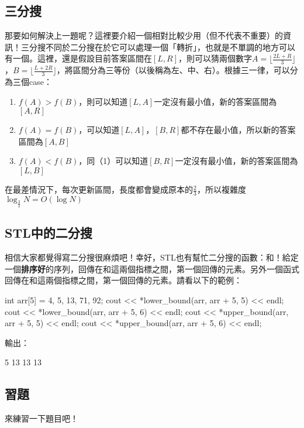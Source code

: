 \documentclass[main.tex]{subfiles}
\begin{document}
	\subsection{三分搜}
		那要如何解決上一題呢？這裡要介紹一個相對比較少用（但不代表不重要）的資訊！三分搜不同於二分搜在於它可以處理一個「轉折」，也就是不單調的地方可以有一個。這裡，還是假設目前答案區間在$[L, R]$，則可以猜兩個數字$A = \lfloor \frac{2L + R}{3} \rfloor$，$B = \lfloor \frac{L + 2R}{3} \rfloor$，將區間分為三等份（以後稱為左、中、右）。根據三一律，可以分為三個case：
		\begin{enumerate}
			\item $f(A) > f(B)$，則可以知道$[L, A]$一定沒有最小值，新的答案區間為$[A, R]$
			\item $f(A) = f(B)$，可以知道$[L, A]$，$[B, R]$都不存在最小值，所以新的答案區間為$[A, B]$
			\item $f(A) < f(B)$，同（1）可以知道$[B, R]$一定沒有最小值，新的答案區間為$[L, B]$
		\end{enumerate}
		在最差情況下，每次更新區間，長度都會變成原本的$\frac{2}{3}$，所以複雜度$\log_{\frac{3}{2}}N = O(\log N)$
	\subsection{STL中的二分搜}
		相信大家都覺得寫二分搜很麻煩吧！幸好，STL也有幫忙二分搜的函數：和！給定一個\textbf{排序好}的序列，回傳在和這兩個指標之間，第一個回傳的元素。另外一個函式回傳在和這兩個指標之間，第一個回傳的元素。請看以下的範例：
		\begin{C++}
int arr[5] = {4, 5, 13, 71, 92};
cout << *lower_bound(arr, arr + 5, 5) << endl;
cout << *lower_bound(arr, arr + 5, 6) << endl;
cout << *upper_bound(arr, arr + 5, 5) << endl;
cout << *upper_bound(arr, arr + 5, 6) << endl;
		\end{C++}
	輸出：
	\begin{C++}
5
13
13
13
	\end{C++}
	\subsection{習題}
		來練習一下題目吧！
\end{document}
